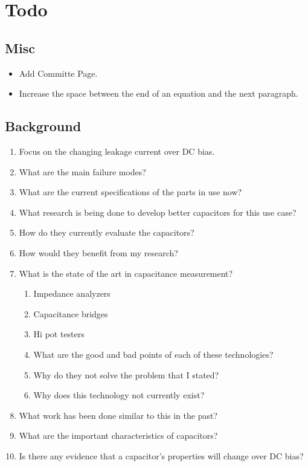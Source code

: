 \documentclass{article}
\begin{document}
\section{Todo}

\subsection{Misc}
\begin{itemize}
    \item Add Committe Page.
    \item Increase the space between the end of an equation and the next paragraph.
\end{itemize}

\subsection{Background}
\begin {enumerate}
    \item Focus on the changing leakage current over DC bias.
    \item What are the main failure modes?
    \item What are the current specifications of the parts in use now?
    \item What research is being done to develop better capacitors for this use case?
    \item How do they currently evaluate the capacitors?
    \item How would they benefit from my research?
    \item What is the state of the art in capacitance measurement?
    \begin {enumerate}
        \item Impedance analyzers
        \item Capacitance bridges
        \item Hi pot testers
        \item What are the good and bad points of each of these technologies?
        \item Why do they not solve the problem that I stated? 
        \item Why does this technology not currently exist?
    \end {enumerate}
    \item What work has been done similar to this in the past?
    \item What are the important characteristics of capacitors?
    \item Is there any evidence that a capacitor's properties will change over DC bias?
\end {enumerate}
\end{document}
